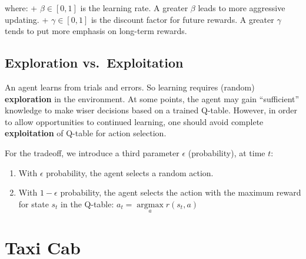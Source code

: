 \documentclass[
  letterpaper,
]{scrbook}
\providecommand{\tightlist}{%
  \setlength{\itemsep}{0pt}\setlength{\parskip}{0pt}}
\begin{document}
where: + \(\beta \in [0,1]\) is the learning rate. A greater \(\beta\)
leads to more aggressive updating. + \(\gamma \in [0,1]\) is the
discount factor for future rewards. A greater \(\gamma\) tends to put
more emphasis on long-term rewards.

\subsection*{Exploration
vs.~Exploitation}\label{exploration-vs.-exploitation}

An agent learns from trials and errors. So learning requires (random)
\textbf{exploration} in the environment. At some points, the agent may
gain ``sufficient'' knowledge to make wiser decisions based on a trained
Q-table. However, in order to allow opportunities to continued learning,
one should avoid complete \textbf{exploitation} of Q-table for action
selection.

For the tradeoff, we introduce a third parameter \(\epsilon\)
(probability), at time \(t\):

\begin{enumerate}
\def\labelenumi{\arabic{enumi}.}
\tightlist
\item
  With \(\epsilon\) probability, the agent selects a random action.
\item
  With \(1 - \epsilon\) probability, the agent selects the action with
  the maximum reward for state \(s_t\) in the Q-table:
  \(a_t = \underset{a}{\operatorname{argmax}}{r(s_t,a)}\)
\end{enumerate}

\section*{Taxi Cab}\label{taxi-cab}

\end{document}
